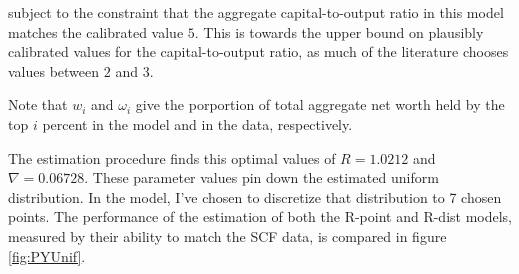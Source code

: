 \par subject to the constraint that the aggregate capital-to-output ratio in this model matches the calibrated value $5$. This is towards the upper bound on plausibly calibrated values for the capital-to-output ratio, as much of the literature chooses values between $2$ and  $3$.

\par Note that $w_i$ and $\omega_i$ give the porportion of total aggregate net worth held by the top $i$ percent in the model and in the data, respectively.

\par The estimation procedure finds this optimal values of $R = 1.0212$ and $\nabla = 0.06728$. These parameter values pin down the estimated uniform distribution. In the model, I've chosen to discretize that distribution to 7 chosen points. The performance of the estimation of both the R-point and R-dist models, measured by their ability to match the SCF data, is compared in figure \ref{fig:PYUnif}.

